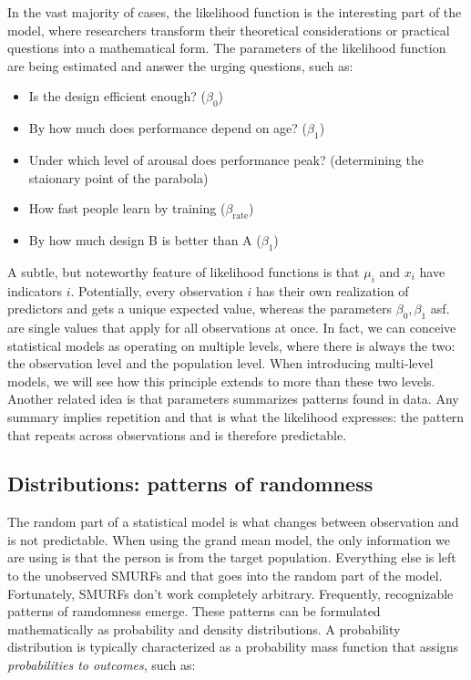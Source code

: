 \documentclass[]{svmono}
\providecommand{\tightlist}{%
  \setlength{\itemsep}{0pt}\setlength{\parskip}{0pt}}
\begin{document}
In the vast majority of cases, the likelihood function is the
interesting part of the model, where researchers transform their
theoretical considerations or practical questions into a mathematical
form. The parameters of the likelihood function are being estimated and
answer the urging questions, such as:

\begin{itemize}
\tightlist
\item
  Is the design efficient enough? (\(\beta_0\))
\item
  By how much does performance depend on age? (\(\beta_1\))
\item
  Under which level of arousal does performance peak? (determining the
  staionary point of the parabola)
\item
  How fast people learn by training (\(\beta_\textrm{rate}\))
\item
  By how much design B is better than A (\(\beta_1\))
\end{itemize}

A subtle, but noteworthy feature of likelihood functions is that
\(\mu_i\) and \(x_i\) have indicators \(i\). Potentially, every
observation \(i\) has their own realization of predictors and gets a
unique expected value, whereas the parameters \(\beta_0, \beta_1\) asf.
are single values that apply for all observations at once. In fact, we
can conceive statistical models as operating on multiple levels, where
there is always the two: the observation level and the population level.
When introducing multi-level models, we will see how this principle
extends to more than these two levels. Another related idea is that
parameters summarizes patterns found in data. Any summary implies
repetition and that is what the likelihood expresses: the pattern that
repeats across observations and is therefore predictable.

\subsection{Distributions: patterns of randomness}\label{distributions}

The random part of a statistical model is what changes between
observation and is not predictable. When using the grand mean model, the
only information we are using is that the person is from the target
population. Everything else is left to the unobserved SMURFs and that
goes into the random part of the model. Fortunately, SMURFs don't work
completely arbitrary. Frequently, recognizable patterns of ramdomness
emerge. These patterns can be formulated mathematically as probability
and density distributions. A probability distribution is typically
characterized as a probability mass function that assigns
\emph{probabilities to outcomes}, such as:
\end{document}
